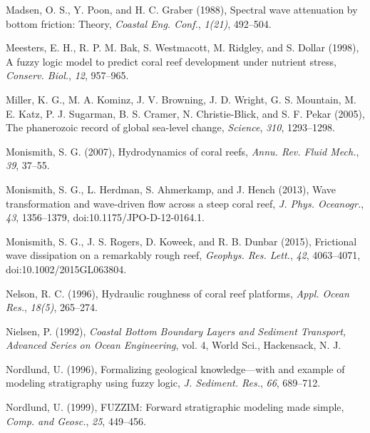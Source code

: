 \documentclass[default,jgrga]{agutex2015}
\begin{document}
\begin{article}
\begin{thebibliography}{}
Madsen, O. S., Y. Poon, and H. C. Graber (1988), Spectral wave attenuation by bottom friction: Theory, \textit{Coastal Eng. Conf.}, \textit{1(21)}, 492--504.

Meesters, E. H., R. P. M. Bak, S. Westmacott, M. Ridgley, and S. Dollar (1998), A fuzzy logic model to predict coral reef development under nutrient stress, \textit{Conserv. Biol.}, \textit{12}, 957--965.

Miller, K. G., M. A. Kominz, J. V. Browning, J. D. Wright, G. S. Mountain, M. E. Katz, P. J. Sugarman, B. S. Cramer, N. Christie-Blick, and S. F. Pekar (2005), The phanerozoic record of global sea-level change, \textit{Science}, \textit{310}, 1293--1298.

Monismith, S. G. (2007), Hydrodynamics of coral reefs, \textit{Annu. Rev. Fluid Mech.}, \textit{39}, 37--55.

Monismith, S. G., L. Herdman, S. Ahmerkamp, and J. Hench (2013), Wave transformation and wave-driven flow across a steep coral reef, \textit{J. Phys. Oceanogr.}, \textit{43}, 1356--1379, doi:10.1175/JPO-D-12-0164.1.

Monismith, S. G., J. S. Rogers, D. Koweek, and R. B. Dunbar (2015), Frictional wave dissipation on a remarkably rough reef, \textit{Geophys. Res. Lett.}, \textit{42}, 4063--4071, doi:10.1002/2015GL063804.

Nelson, R. C. (1996), Hydraulic roughness of coral reef platforms, \textit{Appl. Ocean Res.}, \textit{18(5)}, 265--274.

Nielsen, P. (1992), \textit{Coastal Bottom Boundary Layers and Sediment Transport, Advanced Series on Ocean Engineering}, vol. 4, World Sci., Hackensack, N. J.

Nordlund, U. (1996), Formalizing geological knowledge—with and example of modeling stratigraphy using fuzzy logic, \textit{J. Sediment. Res.}, \textit{66}, 689--712.

Nordlund, U. (1999), FUZZIM: Forward stratigraphic modeling made simple, \textit{Comp. and Geosc.}, \textit{25}, 449--456.


\end{thebibliography}
\end{article}
\end{document}
